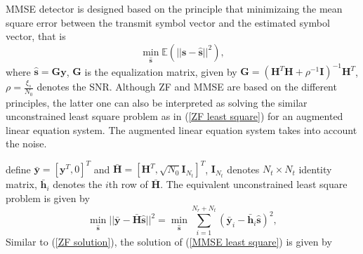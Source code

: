 \documentclass[10pt, draftclsnofoot, onecolumn]{IEEEtran}
\begin{document}
MMSE detector is designed based on the principle that minimizaing the mean square error between the transmit symbol vector and the estimated symbol vector, that is\cite{paulraj2003introduction} 
\begin{equation}
\min_{\hat{\mathbf{s}}}\mathbb{E}(||\mathbf{s}-\hat{\mathbf{s}}||^{2}),
\label{MMSE criterison}
\end{equation}
where $\hat{\mathbf{s}}=\mathbf{G}\mathbf{y}$, $\mathbf{G}$ is the equalization matrix, given by 
$\mathbf{G}=(\mathbf{H}^{T}\mathbf{H}+\rho^{-1}\mathbf{I})^{-1}\mathbf{H}^{T}$, $\rho=\frac{\xi_{s}}{N_{0}}$ denotes the SNR. Although ZF and MMSE are based on the different principles, the latter one can also be interpreted as solving the similar unconstrained least square problem as in (\ref{ZF least square}) for an augmented linear equation system. The augmented linear equation system takes into account the noise.
define $\bar{\mathbf{y}}=[\mathbf{y}^{T}, 0]^{T}$ and $\bar{\mathbf{H}}=[\mathbf{H}^{T}, \sqrt{N_{0}}\mathbf{I}_{N_{t}}]^{T}$, $\mathbf{I}_{N_{t}}$ denotes $N_{t}\times N_{t}$ identity matrix, $\bar{\mathbf{h}}_{i}$ denotes the $i$th row of $\bar{\mathbf{H}}$. The equivalent unconstrained least square problem is given by 
\begin{equation}
\min_{\hat{\mathbf{s}}}||\bar{\mathbf{y}}-\bar{\mathbf{H}}\hat{\mathbf{s}}||^{2}=\min_{\hat{\mathbf{s}}}\sum_{i=1}^{N_{r}+N_{t}}(\bar{\mathbf{y}}_{i}-\bar{\mathbf{h}}_{i}\hat{\mathbf{s}})^{2},
\label{MMSE least square}
\end{equation}
Similar to (\ref{ZF solution}), the solution of (\ref{MMSE least square}) is given by\cite{gore2002performance}\cite{wubben2003mmse}
\end{document}
